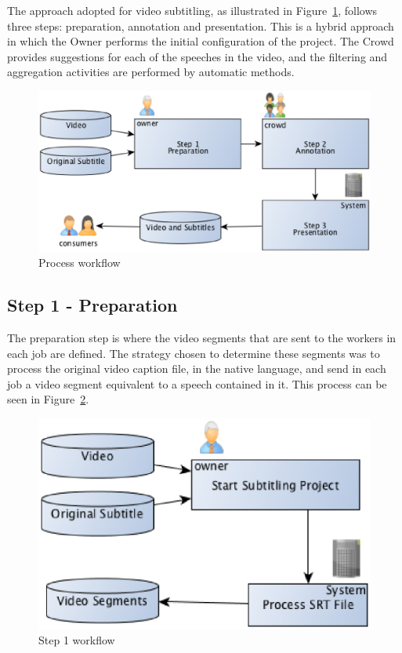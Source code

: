 The approach adopted for video subtitling, as illustrated in Figure~\ref{process}, follows three steps: preparation, annotation and presentation. This is a hybrid approach in which the Owner performs the initial configuration of the project. The Crowd provides suggestions for each of the speeches in the video, and the filtering and aggregation activities are performed by automatic methods.

\begin{figure}[H]
	\centerline{\includegraphics[scale=0.4] {figure/process-workflow}}
	\caption{Process workflow}
	\label{process}
\end{figure}

\subsection{Step 1 - Preparation}
The preparation step is where the video segments that are sent to the workers in each job are defined. The strategy chosen to determine these segments was to process the original video caption file, in the native language, and send in each job a video segment equivalent to a speech contained in it. This process can be seen in Figure~\ref{preparation}.


\begin{figure}[H]
	\centerline{\includegraphics[scale=0.4] {figure/preparation-workflow}}
	\caption{Step 1 workflow}
	\label{preparation}
\end{figure}

